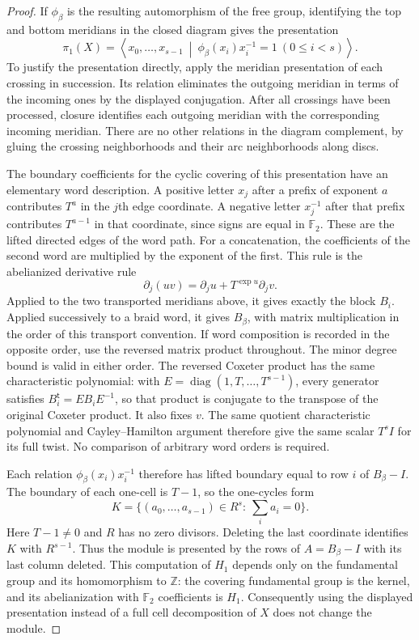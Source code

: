 \documentclass[11pt,oneside]{report}
\theoremstyle{definition}
\numberwithin{equation}{section}
\begin{document}
\begin{proof}
If $\phi_\beta$ is the resulting automorphism of the free group,
identifying the top and bottom meridians in the closed diagram gives
the presentation
\[
 \pi_1(X)=\left\langle x_0,\ldots,x_{s-1}\ \middle|\
       \phi_\beta(x_i)x_i^{-1}=1\ (0\leq i<s)\right\rangle.
\]
To justify the presentation directly, apply the meridian presentation
of each crossing in succession. Its relation eliminates the outgoing
meridian in terms of the incoming ones by the displayed conjugation.
After all crossings have been processed, closure identifies each
outgoing meridian with the corresponding incoming meridian.
There are no other relations in the diagram complement, by gluing
the crossing neighborhoods and their arc neighborhoods along discs.

The boundary coefficients for the cyclic covering of this
presentation have an elementary word description. A positive letter
$x_j$ after a prefix of exponent $a$ contributes $T^a$ in the
$j$th edge coordinate. A negative letter $x_j^{-1}$ after that
prefix contributes $T^{a-1}$ in that coordinate, since signs are
equal in $\mathbb F_2$. These are the lifted directed edges of the
word path. For a concatenation, the coefficients of the second word
are multiplied by the exponent of the first. This rule is the
abelianized derivative rule
\[
 \partial_j(uv)=\partial_j u+T^{\exp u}\partial_j v.
\]
Applied to the two transported meridians above, it gives exactly the
block $B_i$. Applied successively to a braid word, it gives
$B_\beta$, with matrix multiplication in the order of this transport
convention. If word composition is recorded in the opposite order,
use the reversed matrix product throughout. The minor degree bound
is valid in either order. The reversed Coxeter product has the same
characteristic polynomial: with
$E=\operatorname{diag}(1,T,\ldots,T^{s-1})$, every generator satisfies
$B_i^{\mathsf t}=EB_iE^{-1}$, so that product is conjugate to the
transpose of the original Coxeter product. It also fixes $v$. The
same quotient characteristic polynomial and Cayley--Hamilton argument
therefore give the same scalar $T^sI$ for its full twist. No comparison
of arbitrary word orders is required.

Each relation $\phi_\beta(x_i)x_i^{-1}$ therefore has lifted
boundary equal to row $i$ of $B_\beta-I$.
The boundary of each one-cell is $T-1$, so the one-cycles form
\[
 K=\{(a_0,\ldots,a_{s-1})\in R^s:\ \sum_i a_i=0\}.
\]
Here $T-1\ne0$ and $R$ has no zero divisors.
Deleting the last coordinate identifies $K$ with $R^{s-1}$.
Thus the module is presented by the rows of
$A=B_\beta-I$ with its last column deleted. This computation of
$H_1$ depends only on the fundamental group and its homomorphism to
$\mathbb Z$: the covering fundamental group is the kernel, and
its abelianization with $\mathbb F_2$ coefficients is $H_1$.
Consequently using the displayed presentation instead of a full
cell decomposition of $X$ does not change the module.


\end{proof}
\end{document}
